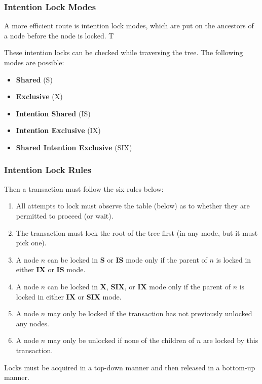 \begin{frame}
\frametitle{Intention Lock Modes}

A more efficient route is \alert{intention lock modes}, which are put on the ancestors of a node before the node is locked. T

These intention locks can be checked while traversing the tree. The following modes are possible:

\begin{itemize}
	\item \textbf{Shared} (S)
	\item \textbf{Exclusive} (X) 
	\item \textbf{Intention Shared} (IS) 
	\item \textbf{Intention Exclusive} (IX) 
	\item \textbf{Shared Intention Exclusive} (SIX)
\end{itemize} 


\end{frame}

\begin{frame}
\frametitle{Intention Lock Rules}

Then a transaction must follow the six rules below:

\begin{enumerate}
	\item All attempts to lock must observe the table (below) as to whether they are permitted to proceed (or wait).
	\item The transaction must lock the root of the tree first (in any mode, but it must pick one).
	\item A node $n$ can be locked in \textbf{S} or \textbf{IS} mode only if the parent of $n$ is locked in either \textbf{IX} or \textbf{IS} mode.
	\item A node $n$ can be locked in \textbf{X}, \textbf{SIX}, or \textbf{IX} mode only if the parent of $n$ is locked in either \textbf{IX} or \textbf{SIX} mode.
	\item A node $n$ may only be locked if the transaction has not previously unlocked any nodes.
	\item A node $n$ may only be unlocked if none of the children of $n$ are locked by this transaction.
\end{enumerate}

Locks must be acquired in a top-down manner and then released in a bottom-up manner. 

\end{frame}

